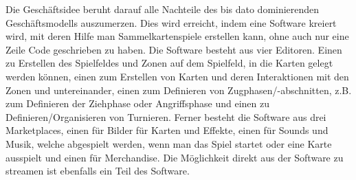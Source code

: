 \documentclass[fontsize=12, a4aper]{scrartcl}
\begin{document}
Die Geschäftsidee beruht darauf alle Nachteile des bis dato dominierenden Geschäftsmodells auszumerzen. Dies wird erreicht, indem eine Software kreiert wird, mit deren Hilfe man Sammelkartenspiele erstellen kann, ohne auch nur eine Zeile Code geschrieben zu haben. Die Software besteht aus vier Editoren. Einen zu Erstellen des Spielfeldes und Zonen auf dem Spielfeld, in die Karten gelegt werden können, einen zum Erstellen von Karten und deren Interaktionen mit den Zonen und untereinander, einen zum Definieren von Zugphasen/-abschnitten, z.B. zum Definieren der Ziehphase oder Angriffsphase und einen zu Definieren/Organisieren von Turnieren. Ferner besteht die Software aus drei Marketplaces, einen für Bilder für Karten und Effekte, einen für Sounds und Musik, welche abgespielt werden, wenn man das Spiel startet oder eine Karte ausspielt und einen für Merchandise. Die Möglichkeit direkt aus der Software zu streamen ist ebenfalls ein Teil des Software.\hfill\newline
\end{document}
